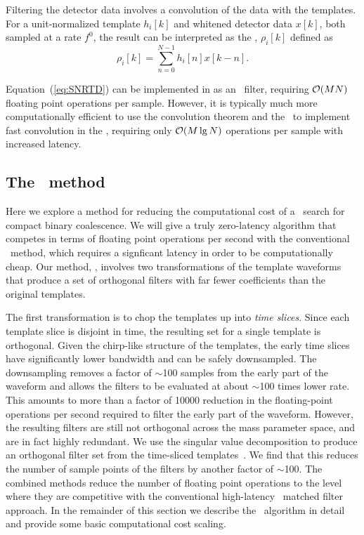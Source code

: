 Filtering the detector data involves a convolution of the data with the
templates.  For a unit-normalized template $h_i[k]$ and whitened detector data
$x[k]$, both sampled at a rate $f^0$, the result can be interpreted as the
\SNR{}, $\rho_i[k]$ defined as
%
%
\begin{equation}
	\label{eq:SNRTD}
	\rho_i [k] = \sum_{n=0}^{N-1} h_{i}[n] x [k-n].
\end{equation}

Equation~(\ref{eq:SNRTD}) can be implemented in \TD as an
\fir\ filter, requiring $\mathcal O(M N)$ floating point
operations per sample.  However, it is typically much more computationally
efficient to use the convolution theorem and the \fft\ to implement fast
convolution in the \FD, requiring only $\mathcal O(M
\lg N)$ operations per sample with increased latency.


\subsection{The \lloid\ method}

Here we explore a method for reducing the
computational cost of a \TD\ search for compact binary coalescence.  We will
give a truly zero-latency algorithm that competes in terms of floating point
operations per second with the conventional \FD\ method, which requires a
signficant latency in order to be computationally cheap. Our method, \lloid{},
involves two transformations of the template waveforms that produce a set of
orthogonal filters with far fewer coefficients than the original templates.

The first transformation is to chop the \TD{} templates up into \emph{time
slices}.  Since each template slice is disjoint in time, the resulting set for a
single template is orthogonal.  Given the chirp-like structure of the
templates, the early time slices have significantly lower bandwidth and can be
safely downsampled.  The downsampling removes a factor of $\sim$100 samples
from
%
%
the early part of the waveform and allows the filters to be evaluated at about
$\sim$100 times lower rate.  This amounts to more than a factor of 10000
reduction in the floating-point operations per second required to filter the
early part of the waveform.  However, the resulting filters are still not
orthogonal across the mass parameter space, and are in fact highly redundant.
We use the singular value decomposition to produce an orthogonal filter set
from the time-sliced templates~\cite{Cannon:2010p10398}.  We find that this
reduces the number of sample points of the filters by another factor of $\sim$100.
The combined methods reduce the number of floating point operations to
the level where they are competitive with the conventional high-latency \FD\
matched filter approach.  In the remainder of this section we describe the
\lloid\ algorithm in detail and provide some basic computational cost scaling.  

